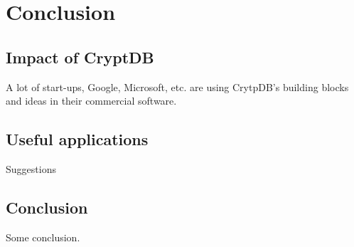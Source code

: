 \chapter{Conclusion}
\label{chp:conclusion}

\section{Impact of CryptDB}

A lot of start-ups, Google, Microsoft, etc. are using CrytpDB's building blocks and ideas in their commercial software.


\section{Useful applications}

Suggestions

\section{Conclusion}

Some conclusion.

